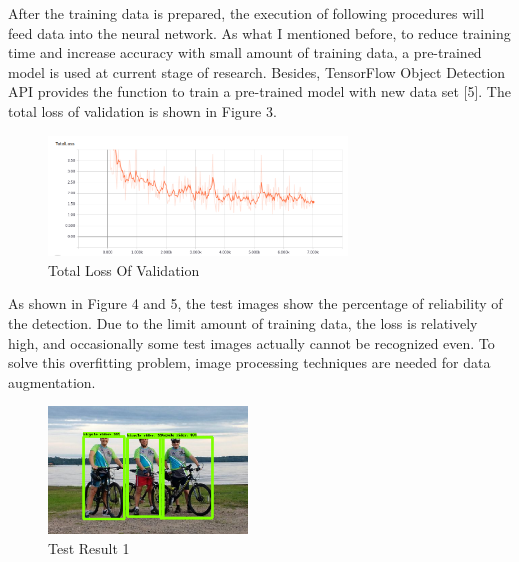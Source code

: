 \documentclass[titlepage]{article}
\begin{document}
After the training data is prepared, the execution of following procedures
will feed data into the neural network. As what I mentioned before, to reduce
training time and increase accuracy with small amount of training data, a
pre-trained model is used at current stage of research. Besides, TensorFlow
Object Detection API provides the function to train a pre-trained model with
new data set [5]. The total loss of validation is shown in Figure 3.

\begin{figure}[htbp]
\centering
\includegraphics[width=300]{total_loss.png}
\caption{Total Loss Of Validation}
\end{figure}

As shown in Figure 4 and 5, the test images show the percentage of
reliability of the detection. Due to the limit amount of training data, the
loss is relatively high, and occasionally some test images actually cannot be
recognized even. To solve this overfitting problem, image processing
techniques are needed for data augmentation.

\begin{figure}[htbp]
\centering
\includegraphics[width=200]{test1.png}
\caption{Test Result 1}
\end{figure} 
\end{document}
